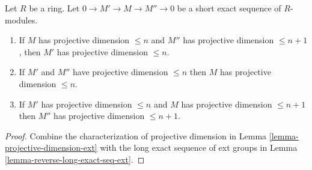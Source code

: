 \begin{lemma}
\label{lemma-exact-sequence-projective-dimension}
Let $R$ be a ring. Let $0 \to M' \to M \to M'' \to 0$ be a short
exact sequence of $R$-modules.
\begin{enumerate}
\item If $M$ has projective dimension $\leq n$ and $M''$
has projective dimension $\leq n + 1$, then $M'$ has projective
dimension $\leq n$.
\item If $M'$ and $M''$ have projective dimension
$\leq n$ then $M$ has projective dimension $\leq n$.
\item If $M'$ has projective dimension $\leq n$ and
$M$ has projective dimension $\leq n + 1$ then
$M''$ has projective dimension $\leq n + 1$.
\end{enumerate}
\end{lemma}

\begin{proof}
Combine the characterization of projective dimension in
Lemma \ref{lemma-projective-dimension-ext}
with the long exact sequence of ext groups in
Lemma \ref{lemma-reverse-long-exact-seq-ext}.
\end{proof}

